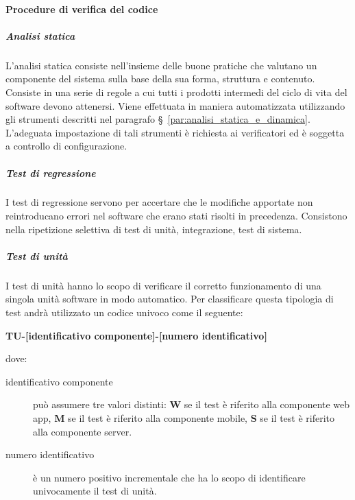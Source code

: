 \documentclass[../../norme-di-progetto.tex]{subfiles}
\begin{document}

\paragraph{Procedure di verifica del codice}%
\label{par:procedure_di_verifica_del_codice}


\subparagraph{Analisi statica}%
\label{subp:verifica/analisi_statica}

L'analisi statica consiste nell'insieme delle buone pratiche che valutano un componente del sistema sulla base della sua forma, struttura e contenuto.
Consiste in una serie di regole a cui tutti i prodotti intermedi del ciclo di vita del software devono attenersi.
Viene effettuata in maniera automatizzata utilizzando gli strumenti descritti nel paragrafo §~\ref{par:analisi_statica_e_dinamica}. L'adeguata impostazione di tali strumenti è richiesta ai verificatori ed è soggetta a controllo di configurazione.

\subparagraph{Test di regressione}%
\label{subp:test_di_regressione}

I test di regressione servono per accertare che le modifiche apportate non reintroducano errori nel software che erano stati risolti in precedenza.
Consistono nella ripetizione selettiva di test di unità, integrazione, test di sistema.

\subparagraph{Test di unità}%
\label{subp:test_di_unita}
I test di unità hanno lo scopo di verificare il corretto funzionamento di una singola unità software in modo automatico.
Per classificare questa tipologia di test andrà utilizzato un codice univoco come il seguente:
\begin{center}
  \textbf{TU-[identificativo componente]-[numero identificativo]}
\end{center}
dove:
\begin{description}
  \item[identificativo componente] può assumere tre valori distinti: \textbf{W} se il test è riferito alla componente web app, \textbf{M} se il test è riferito alla componente mobile, \textbf{S} se il test è riferito alla componente server.
  \item[numero identificativo] è un numero positivo incrementale che ha lo scopo di identificare univocamente il test di unità.
\end{description}

\end{document}
